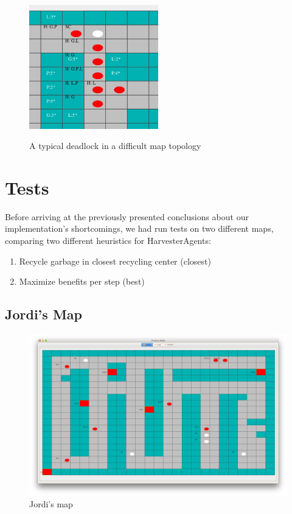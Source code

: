 \begin{figure}[!hbt]
	\centering
	\includegraphics[width=0.5\textwidth]{deadlock}
	\label{deadlock}
	\caption{A typical deadlock in a difficult map topology}
\end{figure}


\section{Tests}

Before arriving at the previously presented conclusions about our implementation's shortcomings, we had run tests on two different maps, comparing two different heuristics for HarvesterAgents: 

\begin{enumerate}
	\item Recycle garbage in closest recycling center (closest)
	\item Maximize benefits per step (best)
\end{enumerate}

\subsection{Jordi's Map}

\begin{figure}[!hbt]
	\centering
	\includegraphics[width=\textwidth]{map_jordi}
	\caption{Jordi's map}
\end{figure}

